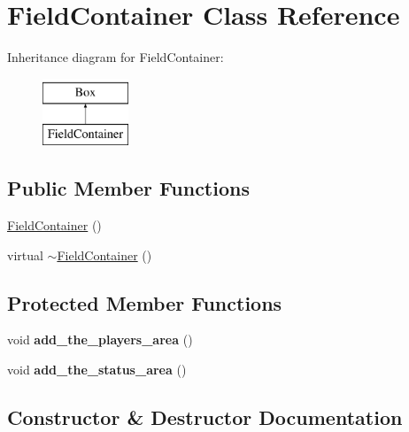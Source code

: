 \hypertarget{classFieldContainer}{}\section{Field\+Container Class Reference}
\label{classFieldContainer}
Inheritance diagram for Field\+Container\+:\begin{figure}[H]
\begin{center}
\leavevmode
\includegraphics[height=2.000000cm]{classFieldContainer}
\end{center}
\end{figure}
\subsection*{Public Member Functions}
\begin{DoxyCompactItemize}
\item 
\mbox{\hyperlink{classFieldContainer_a9c9f7a01def15829951246fae2354f8b}{Field\+Container}} ()
\item 
virtual \mbox{\hyperlink{classFieldContainer_a4e108eb9243a8466a2e3cfa1c45270d1}{$\sim$\+Field\+Container}} ()
\end{DoxyCompactItemize}
\subsection*{Protected Member Functions}
\begin{DoxyCompactItemize}
\item 
\mbox{\label{classFieldContainer_a33b1bc1a8d8bb8897cc9a860dbd801c5}} 
void {\bfseries add\+\_\+the\+\_\+players\+\_\+area} ()
\item 
\mbox{\label{classFieldContainer_ab2156c2f65eac542bdcfd7d089fda2c9}} 
void {\bfseries add\+\_\+the\+\_\+status\+\_\+area} ()
\end{DoxyCompactItemize}


\subsection{Constructor \& Destructor Documentation}
\mbox{\label{classFieldContainer_a9c9f7a01def15829951246fae2354f8b}} 
